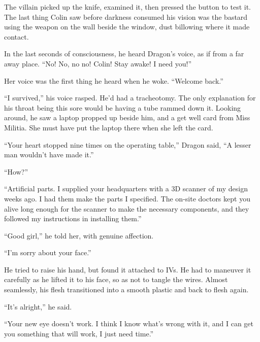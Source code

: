 The villain picked up the knife, examined it, then pressed the button to test it.  The last thing Colin saw before darkness consumed his vision was the bastard using the weapon on the wall beside the window, dust billowing where it made contact.



In the last seconds of consciousness, he heard Dragon's voice, as if from a far away place.  ``No!  No, no no!  Colin!  Stay awake!  I need you!''



\sectionbreak



Her voice was the first thing he heard when he woke.  ``Welcome back.''



``I survived,'' his voice rasped.  He'd had a tracheotomy.  The only explanation for his throat being this sore would be having a tube rammed down it.  Looking around, he saw a laptop propped up beside him, and a get well card from Miss Militia.  She must have put the laptop there when she left the card.



``Your heart stopped nine times on the operating table,'' Dragon said, ``A lesser man wouldn't have made it.''



``How?''



``Artificial parts.  I supplied your headquarters with a 3D scanner of my design weeks ago.  I had them make the parts I specified.  The on-site doctors kept you alive long enough for the scanner to make the necessary components, and they followed my instructions in installing them.''



``Good girl,'' he told her, with genuine affection.



``I'm sorry about your face.''



He tried to raise his hand, but found it attached to IVs.  He had to maneuver it carefully as he lifted it to his face, so as not to tangle the wires.  Almost seamlessly, his flesh transitioned into a smooth plastic and back to flesh again.



``It's alright,'' he said.



``Your new eye doesn't work.  I think I know what's wrong with it, and I can get you something that will work, I just need time.''



